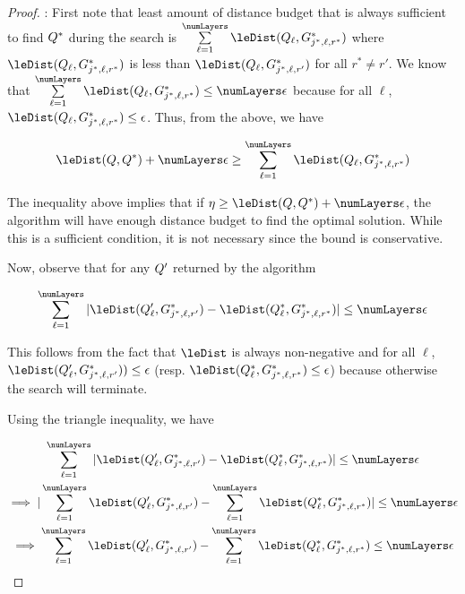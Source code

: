 \documentclass[pdflatex,sn-mathphys-num]{sn-jnl}%
\theoremstyle{thmstyleone}%
\theoremstyle{thmstyletwo}%
\theoremstyle{thmstylethree}%
\begin{document}
\begin{appendices}
\begin{theorem}
\end{theorem}

\begin{proof}: 
First note that least amount of distance budget that is always sufficient to find $Q^{*}$ during the search is  $\sum\limits_{\ell = 1}^{\numLayers} \leDist(\queryMat_\ell, G^{\ast}_{j^{*}, \ell, r^{\ast}})$ where $\leDist(\queryMat_\ell, G^{\ast}_{j^{*}, \ell, r^{\ast}})$ is less than 
$\leDist(\queryMat_\ell, G^{\ast}_{j^{*}, \ell, r'} )$
for all $r^{\ast} \neq r'$. We know that $ \sum\limits_{\ell = 1}^{\numLayers} \leDist(\queryMat_\ell, G^{\ast}_{j^{*}, \ell, r^{\ast}}) \le \numLayers \epsilon$ because for all $\ell$, $\leDist(\queryMat_\ell, G^{\ast}_{j^{*}, \ell, r^{\ast}}) \le \epsilon$. Thus, from the above, we have

\[
   \leDist(\queryMat, \optMat) + \numLayers\epsilon \ge  \sum\limits_{\ell = 1}^{\numLayers} \leDist(\queryMat_\ell, G^{\ast}_{j^{*}, \ell, r^{\ast}}) 
\]

The inequality above implies that if $\eta \ge \leDist(\queryMat, \optMat) + \numLayers \epsilon$, the algorithm will have enough distance budget to find the optimal solution. While this is a sufficient condition, it is not necessary since the bound is conservative. 


Now, observe that for any $Q'$ returned by the algorithm


\[
\sum\limits_{\ell = 1}^{\numLayers}|\leDist(\queryRetMat_\ell, G^{\ast}_{j^{*}, \ell, r'}) - \leDist(\optMat_\ell, G^{\ast}_{j^{*}, \ell, r^{\ast}})| \le \numLayers\epsilon
\]

This follows from the fact that $\leDist$ is always non-negative and for all $\ell$, $\leDist(\queryRetMat_\ell, G^{\ast}_{j^{*}, \ell, r'})) \le \epsilon$ (resp. $\leDist(\optMat_{\ell}, G^{\ast}_{j^{*}, \ell, r^{\ast}}) \le \epsilon$) because otherwise the search will terminate. 

Using the triangle inequality, we have

\begin{multline*}
\sum\limits_{\ell = 1}^{\numLayers}|\leDist(\queryRetMat_\ell, G^{\ast}_{j^{*}, \ell, r'}) - \leDist(\optMat_\ell, G^{\ast}_{j^{*}, \ell, r^{\ast}})| \le \numLayers \epsilon \\
\implies 
|\sum\limits_{\ell = 1}^{\numLayers} \leDist(\queryRetMat_\ell, G^{\ast}_{j^{*}, \ell, r'}) -  \sum\limits_{\ell = 1}^{\numLayers} \leDist(\optMat_\ell, G^{\ast}_{j^{*}, \ell, r^{\ast}})| \le \numLayers\epsilon\\
\implies \sum\limits_{\ell = 1}^{\numLayers} \leDist(\queryRetMat_\ell, G^{\ast}_{j^{*}, \ell, r'}) - \sum\limits_{\ell = 1}^{\numLayers}\leDist(\optMat_\ell, G^{\ast}_{j^{*}, \ell, r^{\ast}}) \le \numLayers \epsilon
 \end{multline*}


\end{proof}
\end{appendices}
\end{document}
